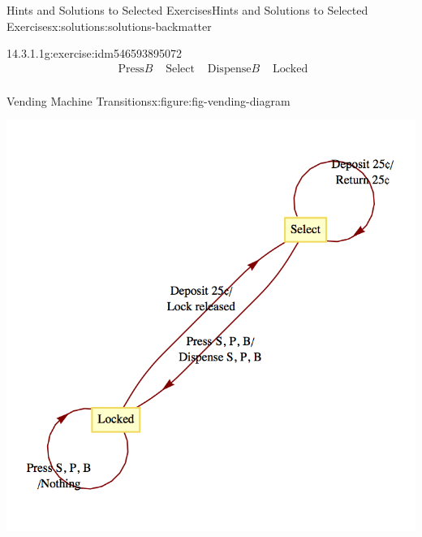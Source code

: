 \documentclass[oneside,10pt,]{book}
\newcommand{\blocktitlefont}{\relax}
\numberwithin{equation}{section}
\begin{document}
\begin{solutions-chapter}{Hints and Solutions to Selected Exercises}{}{Hints and Solutions to Selected Exercises}{}{}{x:solutions:solutions-backmatter}
\begin{divisionsolution}{14.3.1.1}{}{g:exercise:idm546593895072}
\begin{equation*}
\begin{array}{cccc}
\textrm{ Press} B & \textrm{ Select} & \textrm{ Dispense} B & \textrm{ Locked} \\
\end{array}
\end{equation*}
%
\begin{figureptx}{Vending Machine Transitions}{x:figure:fig-vending-diagram}{}%
\begin{image}{0.15}{0.7}{0.15}%
\includegraphics[width=\linewidth]{images/fig-vending-diagram.png}
\end{image}%
\tcblower
\end{figureptx}%
\end{divisionsolution}%
%
\end{solutions-chapter}
\end{document}
